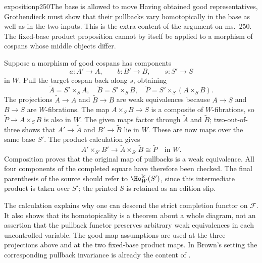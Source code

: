 \begin{dcomment}{exposition}{p250}{The base is allowed to move}
Having obtained good representatives, Grothendieck must show that their pullbacks vary homotopically in the base as well as in the two inputs. This is the extra content of the argument on ms.~250. The fixed-base product proposition cannot by itself be applied to a morphism of cospans whose middle objects differ.

Suppose a morphism of good cospans has components
\[
 a:A'\to A,\qquad b:B'\to B,\qquad s:S'\to S
\]
in $W$. Pull the target cospan back along $s$, obtaining
\[
 \tilde A=S'\times_S A,\quad
 \tilde B=S'\times_S B,\quad
 \tilde P=S'\times_S(A\times_S B).
\]
The projections $\tilde A\to A$ and $\tilde B\to B$ are weak equivalences because $A\to S$ and $B\to S$ are $W$-fibrations. The map $A\times_S B\to S$ is a composite of $W$-fibrations, so $\tilde P\to A\times_S B$ is also in $W$. The given maps factor through $\tilde A$ and $\tilde B$; two-out-of-three shows that $A'\to\tilde A$ and $B'\to\tilde B$ lie in $W$. These are now maps over the same base $S'$. The product calculation gives
\[
 A'\times_{S'}B'\longrightarrow
 \tilde A\times_{S'}\tilde B\cong\tilde P
 \quad\text{in }W.
\]
Composition proves that the original map of pullbacks is a weak equivalence. All four components of the completed square have therefore been checked. The final parenthesis of the source should refer to $\Ho_W^{\mathrm{lc}}(S')$, since this intermediate product is taken over $S'$; the printed $S$ is retained as an edition slip.

The calculation explains why one can descend the strict completion functor on $\mathcal F$. It also shows that its homotopicality is a theorem about a whole diagram, not an assertion that the pullback functor preserves arbitrary weak equivalences in each uncontrolled variable. The good-map assumptions are used at the three projections above and at the two fixed-base product maps. In Brown's setting the corresponding pullback invariance is already the content of \citet[Part~I, \S4, Lemmas~1--2, pp.~428--429]{Brown1973}.
\end{dcomment}

